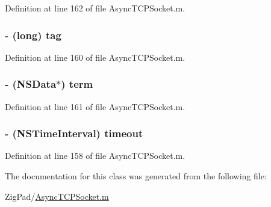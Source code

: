 Definition at line 162 of file AsyncTCPSocket.m.

\hypertarget{interface_async_read_packet_ae10c29173f0af40507d7e787905c7130}{
\subsubsection[{tag}]{\setlength{\rightskip}{0pt plus 5cm}-\/ (long) {\bf tag}}}
\label{interface_async_read_packet_ae10c29173f0af40507d7e787905c7130}


Definition at line 160 of file AsyncTCPSocket.m.

\hypertarget{interface_async_read_packet_ac09dba8aa168ea0ea2797060e554412e}{
\subsubsection[{term}]{\setlength{\rightskip}{0pt plus 5cm}-\/ (NSData$\ast$) {\bf term}}}
\label{interface_async_read_packet_ac09dba8aa168ea0ea2797060e554412e}


Definition at line 161 of file AsyncTCPSocket.m.

\hypertarget{interface_async_read_packet_a39233eb85b4cbae04411577510e7c5e6}{
\subsubsection[{timeout}]{\setlength{\rightskip}{0pt plus 5cm}-\/ (NSTimeInterval) {\bf timeout}}}
\label{interface_async_read_packet_a39233eb85b4cbae04411577510e7c5e6}


Definition at line 158 of file AsyncTCPSocket.m.



The documentation for this class was generated from the following file:\begin{DoxyCompactItemize}
\item 
ZigPad/\hyperlink{_async_t_c_p_socket_8m}{AsyncTCPSocket.m}\end{DoxyCompactItemize}
